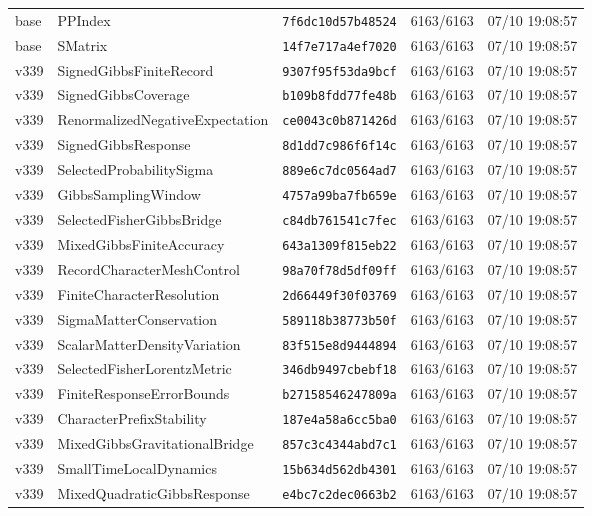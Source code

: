 \documentclass[11pt]{article}
\theoremstyle{definition}\newtheorem{deriv}{Derivação}
\begin{document}
{\begin{longtable}{@{}lllll@{}}
base & PPIndex & \texttt{7f6dc10d57b48524} & 6163/6163 & 07/10 19:08:57 \\
base & SMatrix & \texttt{14f7e717a4ef7020} & 6163/6163 & 07/10 19:08:57 \\
v339 & SignedGibbsFiniteRecord & \texttt{9307f95f53da9bcf} & 6163/6163 & 07/10 19:08:57 \\
v339 & SignedGibbsCoverage & \texttt{b109b8fdd77fe48b} & 6163/6163 & 07/10 19:08:57 \\
v339 & RenormalizedNegativeExpectation & \texttt{ce0043c0b871426d} & 6163/6163 & 07/10 19:08:57 \\
v339 & SignedGibbsResponse & \texttt{8d1dd7c986f6f14c} & 6163/6163 & 07/10 19:08:57 \\
v339 & SelectedProbabilitySigma & \texttt{889e6c7dc0564ad7} & 6163/6163 & 07/10 19:08:57 \\
v339 & GibbsSamplingWindow & \texttt{4757a99ba7fb659e} & 6163/6163 & 07/10 19:08:57 \\
v339 & SelectedFisherGibbsBridge & \texttt{c84db761541c7fec} & 6163/6163 & 07/10 19:08:57 \\
v339 & MixedGibbsFiniteAccuracy & \texttt{643a1309f815eb22} & 6163/6163 & 07/10 19:08:57 \\
v339 & RecordCharacterMeshControl & \texttt{98a70f78d5df09ff} & 6163/6163 & 07/10 19:08:57 \\
v339 & FiniteCharacterResolution & \texttt{2d66449f30f03769} & 6163/6163 & 07/10 19:08:57 \\
v339 & SigmaMatterConservation & \texttt{589118b38773b50f} & 6163/6163 & 07/10 19:08:57 \\
v339 & ScalarMatterDensityVariation & \texttt{83f515e8d9444894} & 6163/6163 & 07/10 19:08:57 \\
v339 & SelectedFisherLorentzMetric & \texttt{346db9497cbebf18} & 6163/6163 & 07/10 19:08:57 \\
v339 & FiniteResponseErrorBounds & \texttt{b27158546247809a} & 6163/6163 & 07/10 19:08:57 \\
v339 & CharacterPrefixStability & \texttt{187e4a58a6cc5ba0} & 6163/6163 & 07/10 19:08:57 \\
v339 & MixedGibbsGravitationalBridge & \texttt{857c3c4344abd7c1} & 6163/6163 & 07/10 19:08:57 \\
v339 & SmallTimeLocalDynamics & \texttt{15b634d562db4301} & 6163/6163 & 07/10 19:08:57 \\
v339 & MixedQuadraticGibbsResponse & \texttt{e4bc7c2dec0663b2} & 6163/6163 & 07/10 19:08:57 \\

\end{longtable}}
\end{document}
